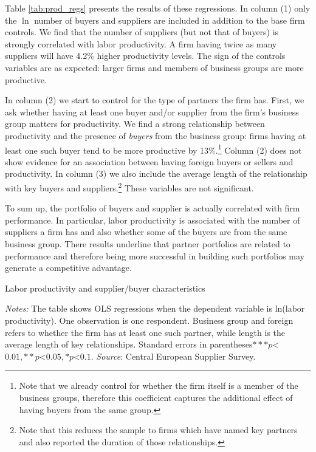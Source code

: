 \documentclass[final, dvipsnames, authoryear,12pt]{elsarticle}
\begin{document}

Table \ref{tab:prod_regs} presents the results of these regressions. In column (1) only the $\ln$ number of buyers and suppliers are included in addition to the base firm controls. We find that the number of suppliers (but not that of buyers) is strongly correlated with labor productivity. A firm having twice as many suppliers will have 4.2\% higher productivity levels. The sign of the controls variables are as expected: larger firms and members of business groups are more productive.

In column (2) we start to control for the type of partners the firm has. First, we ask whether having at least one buyer and/or supplier from the firm's business group matters for productivity. We find a strong relationship between productivity and the presence of \textit{buyers} from the business group: firms having at least one such buyer tend to be more productive by 13\%.\footnote{Note that we already control for whether the firm itself is a member of the business groups, therefore this coefficient captures the additional effect of having buyers from the same group.} Column (2) does not show evidence for an association between having foreign buyers or sellers and productivity. In column (3) we also include the average length of the relationship with key buyers and suppliers.\footnote{Note that this reduces the sample to firms which have named key partners and also reported the duration of those relationships.} These variables are not significant.

To sum up, the portfolio of buyers and supplier is actually correlated with firm performance. In particular, labor productivity is associated with the number of suppliers a firm has and also whether some of the buyers are from the same business group. There results underline that partner portfolios are related to performance and therefore being more successful in building such portfolios may generate a competitive advantage.


\begin{table}[H]
    \caption{Labor productivity and supplier/buyer characteristics}
    \label{tab:prod_regs}
    \centerline{}

    {\scriptsize \textit{Notes:} The table shows OLS regressions when the dependent variable is ln(labor productivity). One observation is one respondent. Business group and foreign refers to whether the firm has at least one such partner, while length is the average length of key relationships. Standard errors in parentheses$ *** p$<$0.01, ** p$<$0.05, * p$<$0.1 $. \textit{Source}: Central European Supplier Survey.}
\end{table}
    
\end{document}

